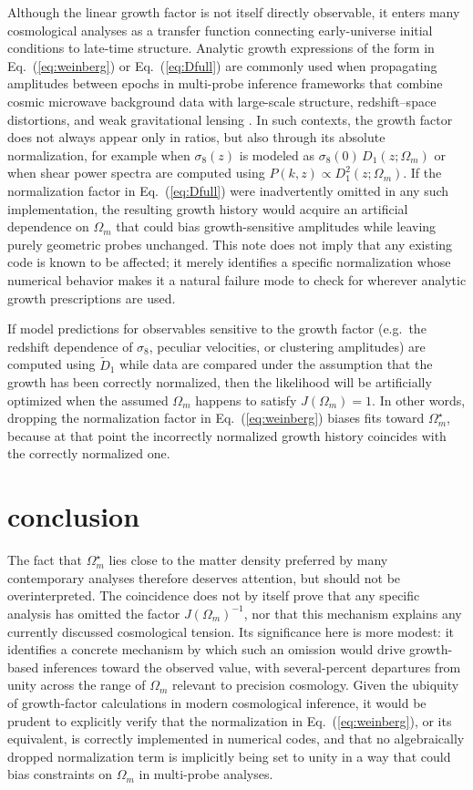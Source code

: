 \documentclass[twocolumn]{aastex701}
\begin{document}
Although the linear growth factor is not itself directly observable, it enters many cosmological analyses as a transfer function connecting early-universe initial conditions to late-time structure. Analytic growth expressions of the form in Eq.~(\ref{eq:weinberg}) or Eq.~(\ref{eq:Dfull}) are commonly used when propagating amplitudes between epochs in multi-probe inference frameworks that combine cosmic microwave background data with large-scale structure, redshift--space distortions, and weak gravitational lensing \citep{carroll1992,eisenstein1999,tegmark2001,hu2004,kilbinger2015,adame2025}. In such contexts, the growth factor does not always appear only in ratios, but also through its absolute normalization, for example when $\sigma_8(z)$ is modeled as $\sigma_8(0)\,D_1(z;\Omega_m)$ or when shear power spectra are computed using $P(k,z) \propto D_1^2(z;\Omega_m)$. If the normalization factor in Eq.~(\ref{eq:Dfull}) were inadvertently omitted in any such implementation, the resulting growth history would acquire an artificial dependence on $\Omega_m$ that could bias growth-sensitive amplitudes while leaving purely geometric probes unchanged. This note does not imply that any existing code is known to be affected; it merely identifies a specific normalization whose numerical behavior makes it a natural failure mode to check for wherever analytic growth prescriptions are used.

If model predictions for observables sensitive to the growth factor (e.g.\ the redshift dependence of $\sigma_8$, peculiar velocities, or clustering amplitudes) are computed using $\tilde{D}_1$ while data are compared under the assumption that the growth has been correctly normalized, then the likelihood will be artificially optimized when the assumed $\Omega_m$ happens to satisfy $J(\Omega_m)=1$. In other words, dropping the normalization factor in Eq.~(\ref{eq:weinberg}) biases fits toward $\Omega_m^\star$, because at that point the incorrectly normalized growth history coincides with the correctly normalized one.

\section{conclusion}

The fact that $\Omega_m^\star$ lies close to the matter density preferred by many contemporary analyses therefore deserves attention, but should not be overinterpreted. The coincidence does not by itself prove that any specific analysis has omitted the factor $J(\Omega_m)^{-1}$, nor that this mechanism explains any currently discussed cosmological tension. Its significance here is more modest: it identifies a concrete mechanism by which such an omission would drive growth-based inferences toward the observed value, with several-percent departures from unity across the range of $\Omega_m$ relevant to precision cosmology. Given the ubiquity of growth-factor calculations in modern cosmological inference, it would be prudent to explicitly verify that the normalization in Eq.~(\ref{eq:weinberg}), or its equivalent, is correctly implemented in numerical codes, and that no algebraically dropped normalization term is implicitly being set to unity in a way that could bias constraints on $\Omega_m$ in multi-probe analyses.

{}

\end{document}
